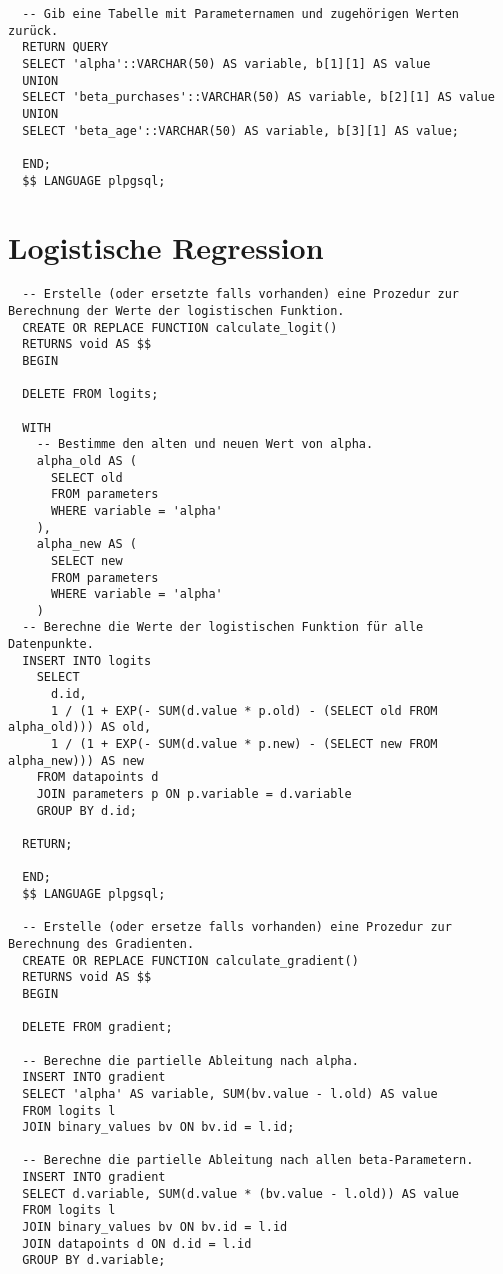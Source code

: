 \begin{verbatim}
  -- Gib eine Tabelle mit Parameternamen und zugehörigen Werten zurück.
  RETURN QUERY
  SELECT 'alpha'::VARCHAR(50) AS variable, b[1][1] AS value
  UNION
  SELECT 'beta_purchases'::VARCHAR(50) AS variable, b[2][1] AS value
  UNION
  SELECT 'beta_age'::VARCHAR(50) AS variable, b[3][1] AS value;

  END;
  $$ LANGUAGE plpgsql;
\end{verbatim}

\section{Logistische Regression}
\label{appendix:E:3}

\begin{verbatim}
  -- Erstelle (oder ersetzte falls vorhanden) eine Prozedur zur Berechnung der Werte der logistischen Funktion.
  CREATE OR REPLACE FUNCTION calculate_logit()
  RETURNS void AS $$
  BEGIN

  DELETE FROM logits;

  WITH
    -- Bestimme den alten und neuen Wert von alpha.
    alpha_old AS (
      SELECT old
      FROM parameters
      WHERE variable = 'alpha'
    ),
    alpha_new AS (
      SELECT new
      FROM parameters
      WHERE variable = 'alpha'
    )
  -- Berechne die Werte der logistischen Funktion für alle Datenpunkte.
  INSERT INTO logits
    SELECT
      d.id,
      1 / (1 + EXP(- SUM(d.value * p.old) - (SELECT old FROM alpha_old))) AS old,
      1 / (1 + EXP(- SUM(d.value * p.new) - (SELECT new FROM alpha_new))) AS new
    FROM datapoints d
    JOIN parameters p ON p.variable = d.variable
    GROUP BY d.id;

  RETURN;

  END;
  $$ LANGUAGE plpgsql;

  -- Erstelle (oder ersetze falls vorhanden) eine Prozedur zur Berechnung des Gradienten.
  CREATE OR REPLACE FUNCTION calculate_gradient()
  RETURNS void AS $$
  BEGIN

  DELETE FROM gradient;

  -- Berechne die partielle Ableitung nach alpha.
  INSERT INTO gradient
  SELECT 'alpha' AS variable, SUM(bv.value - l.old) AS value
  FROM logits l
  JOIN binary_values bv ON bv.id = l.id;

  -- Berechne die partielle Ableitung nach allen beta-Parametern.
  INSERT INTO gradient
  SELECT d.variable, SUM(d.value * (bv.value - l.old)) AS value
  FROM logits l
  JOIN binary_values bv ON bv.id = l.id
  JOIN datapoints d ON d.id = l.id
  GROUP BY d.variable;


\end{verbatim}
